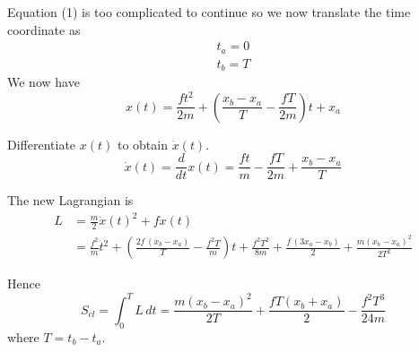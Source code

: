 \documentclass[12pt]{article}
\begin{document}
Equation (1) is too complicated to continue so we now translate the time coordinate as
\begin{align*}
t_a=0
\\
t_b=T
\end{align*}
We now have
\begin{equation*}
x(t)=\frac{ft^2}{2m}+\left(\frac{x_b-x_a}{T}-\frac{fT}{2m}\right)t+x_a
\tag{2}
\end{equation*}

Differentiate $x(t)$ to obtain $\dot x(t)$.
\begin{equation*}
\dot x(t)=
\frac{d}{dt}x(t)=\frac{ft}{m}-\frac{fT}{2m}+\frac{x_b-x_a}{T}
\tag{3}
\end{equation*}

The new Lagrangian is
\begin{align*}
L&=\frac{m}{2}\dot x(t)^2+fx(t)
\\[1ex]
&=\frac{f^2}{m}t^2
+\left(\frac{2f\,(x_b-x_a)}{T}-\frac{f^2T}{m}\right)t
+\frac{f^2T^2}{8m}
+\frac{f\,(3x_a-x_b)}{2}
+\frac{m(x_b-x_a)^2}{2T^2}
\tag{4}
\end{align*}

Hence
\begin{equation*}
S_{cl}=\int_0^T L\,dt
=\frac{m(x_b-x_a)^2}{2T}+\frac{fT(x_b+x_a)}{2}-\frac{f^2T^3}{24m}
\tag{5}
\end{equation*}
where $T=t_b-t_a$.
\end{document}
